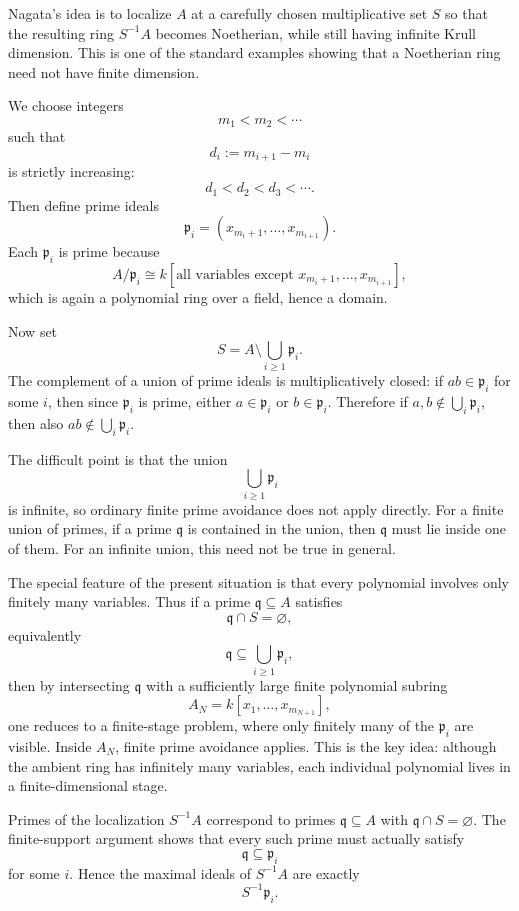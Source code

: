 \documentclass[12pt,a4paper]{article}
\theoremstyle{plain}
\theoremstyle{definition}      %
\begin{document}
Nagata's idea is to localize \(A\) at a carefully chosen multiplicative set \(S\) so that the resulting ring \(S^{-1}A\) becomes Noetherian, while still having infinite Krull dimension. This is one of the standard examples showing that a Noetherian ring need not have finite dimension.

\medskip

We choose integers
\[
m_1<m_2<\cdots
\]
such that
\[
d_i:=m_{i+1}-m_i
\]
is strictly increasing:
\[
d_1<d_2<d_3<\cdots.
\]
Then define prime ideals
\[
\mathfrak p_i=(x_{m_i+1},\dots,x_{m_{i+1}}).
\]
Each \(\mathfrak p_i\) is prime because
\[
A/\mathfrak p_i
\cong
k[\text{all variables except }x_{m_i+1},\dots,x_{m_{i+1}}],
\]
which is again a polynomial ring over a field, hence a domain.

\medskip

Now set
\[
S=A\setminus \bigcup_{i\ge 1}\mathfrak p_i.
\]
The complement of a union of prime ideals is multiplicatively closed: if \(ab\in\mathfrak p_i\) for some \(i\), then since \(\mathfrak p_i\) is prime, either \(a\in\mathfrak p_i\) or \(b\in\mathfrak p_i\). Therefore if \(a,b\notin\bigcup_i\mathfrak p_i\), then also \(ab\notin\bigcup_i\mathfrak p_i\).

\medskip

The difficult point is that the union
\[
\bigcup_{i\ge 1}\mathfrak p_i
\]
is infinite, so ordinary finite prime avoidance does not apply directly. For a finite union of primes, if a prime \(\mathfrak q\) is contained in the union, then \(\mathfrak q\) must lie inside one of them. For an infinite union, this need not be true in general.

The special feature of the present situation is that every polynomial involves only finitely many variables. Thus if a prime \(\mathfrak q\subseteq A\) satisfies
\[
\mathfrak q\cap S=\varnothing,
\]
equivalently
\[
\mathfrak q\subseteq \bigcup_{i\ge 1}\mathfrak p_i,
\]
then by intersecting \(\mathfrak q\) with a sufficiently large finite polynomial subring
\[
A_N=k[x_1,\dots,x_{m_{N+1}}],
\]
one reduces to a finite-stage problem, where only finitely many of the \(\mathfrak p_i\) are visible. Inside \(A_N\), finite prime avoidance applies. This is the key idea: although the ambient ring has infinitely many variables, each individual polynomial lives in a finite-dimensional stage.

\medskip

Primes of the localization \(S^{-1}A\) correspond to primes \(\mathfrak q\subseteq A\) with \(\mathfrak q\cap S=\varnothing\). The finite-support argument shows that every such prime must actually satisfy
\[
\mathfrak q\subseteq \mathfrak p_i
\]
for some \(i\). Hence the maximal ideals of \(S^{-1}A\) are exactly
\[
S^{-1}\mathfrak p_i.
\]
\end{document}
